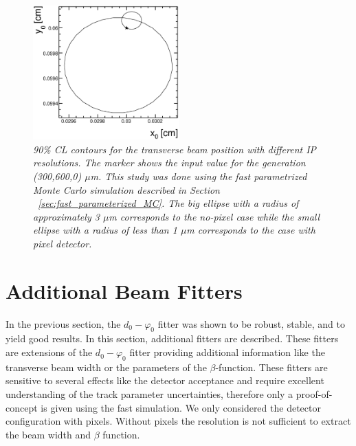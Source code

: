 \documentclass{cmspaper}
\begin{document}
\begin{figure}[hbtp]
  \begin{center}
    \includegraphics[width=0.5\textwidth]{figures/fxy_contour_x0y0.eps}
   \caption{\it 90\% CL contours for the transverse beam position with different
     IP resolutions. The marker shows the input value for the generation (300,600,0) $\mu$m. This study was done using the fast parametrized Monte 
Carlo simulation described in Section ~\ref{sec:fast_parameterized_MC}. The big ellipse with a radius of 
approximately 3  $\mu$m corresponds to the no-pixel case while the small ellipse with a radius of less 
than 1  $\mu$m corresponds to the case with pixel detector. }
   \label{fig:contours}
  \end{center}
\end{figure}


\clearpage
\section{\label{sec:additional}Additional Beam Fitters}
In the previous section, the $d_0 - \varphi_0$ fitter was shown to be robust, stable, and to yield good 
results.
In this section, additional fitters are described. These fitters are extensions of the $d_0 - \varphi_0$ 
fitter providing additional information like the transverse beam width or the parameters of the $\beta$-function.  
These fitters are sensitive to several effects like the detector acceptance and require excellent
understanding of the track parameter uncertainties, therefore only a proof-of-concept is given using the 
fast simulation. We only considered the detector configuration with pixels. Without pixels the 
resolution is not sufficient to extract the beam width and $\beta$ function.
\end{document}
